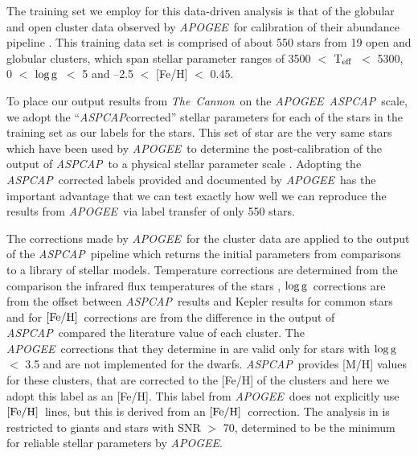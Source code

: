 \documentclass[12pt, preprint]{aastex}
\newcommand{\teff}{\mbox{$\rm T_{eff}$}}
\newcommand{\feh}{\mbox{$\rm [Fe/H]$}}
\newcommand{\logg}{\mbox{$\rm \log g$}}
\newcommand{\tc}{\textsl{The~Cannon}}
\newcommand{\apogee}{\textsl{APOGEE}}
\newcommand{\aspcap}{\textsl{ASPCAP}}
\begin{document}
The training set we employ for this data-driven analysis is that of the globular and open cluster data observed by \apogee\ for calibration of their abundance pipeline \citep{Meszaros2013}. This training data set is comprised of about 550 stars from 19 open and globular clusters, which span stellar parameter ranges of 3500 $<$ \teff\ $<$ 5300, 0 $<$ \logg\ $<$ 5 and --2.5 $<$ [Fe/H] $<$ 0.45. 


To place our output results from \tc\ on the \apogee\ \aspcap\ scale, we adopt the ``\aspcap corrected'' stellar parameters for each of the stars in the training set as our labels for the stars. This set of star are the very same stars which have been used by \apogee\ to determine the post-calibration of the output of \aspcap\ to a physical stellar parameter scale \citep{Meszaros2013}. Adopting the \aspcap\ corrected labels provided and documented by \apogee\  has the important advantage that we can test exactly how well we can reproduce the results from \apogee\ via label transfer of only 550 stars.

The corrections made by \apogee\ for the cluster data are applied to the output of the \aspcap\ pipeline which returns the initial parameters from comparisons to a library of stellar models. Temperature corrections are determined from the comparison the infrared flux temperatures of the stars \citep{Gonzalez2009}, \logg\ corrections are from the offset between \aspcap\ results and Kepler results for common stars and for \feh\ corrections are from the difference in the output of \aspcap\ compared the literature value of each cluster.  The \apogee\ corrections that they determine in \citet{Meszaros2013} are valid only for stars with \logg\ $<$ 3.5 and are not implemented for the dwarfs. \aspcap\ provides [M/H] values for these clusters, that are corrected to the [Fe/H] of the clusters and here we adopt this label as an [Fe/H]. This label from \apogee\ does not explicitly use \feh\ lines, but this is derived from an \feh\ correction. The analysis in \citet{Meszaros2013} is restricted to giants and stars with SNR $>$ 70, determined to be the minimum for reliable stellar parameters by \apogee.
\end{document}
